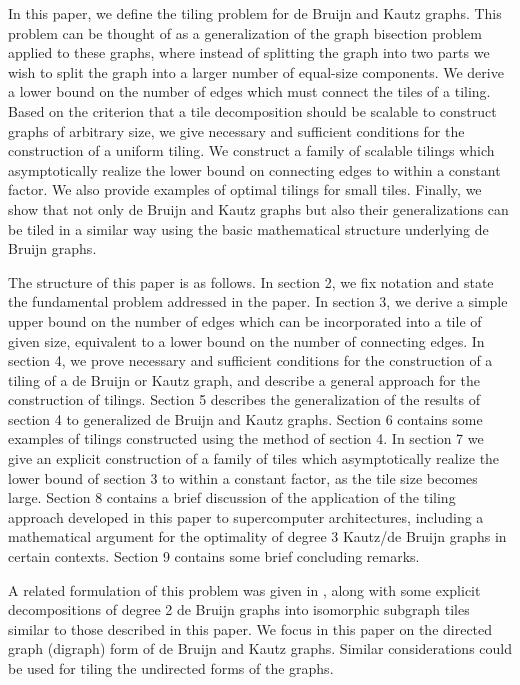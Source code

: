 \documentclass[12pt]{article}
\begin{document}
In this paper, we define the tiling problem for de Bruijn and Kautz
graphs.  This problem can be thought of as a generalization of the
graph bisection problem applied to these graphs, where instead of
splitting the graph into two parts we wish to split the graph into a
larger number of equal-size components.  We derive a lower bound on
the number of edges which must connect the tiles of a tiling.  Based
on the criterion that a tile decomposition should be scalable to
construct graphs of arbitrary size, we give necessary and sufficient
conditions for the construction of a uniform tiling.  We construct a
family of scalable tilings which asymptotically realize the lower
bound on connecting edges to within a constant factor.  We also
provide examples of optimal tilings for small tiles.  Finally, we show
that not only de Bruijn and Kautz graphs but also their
generalizations can be tiled in a similar way using the basic
mathematical structure underlying de Bruijn graphs.


The structure of this paper is as follows.  In section 2, we fix
notation and state the fundamental problem addressed in the paper.  In
section 3, we derive a simple upper bound on the number of edges which
can be incorporated into a tile of given size, equivalent to a lower
bound on the number of connecting edges.  In section 4, we prove
necessary and sufficient conditions for the construction of a tiling
of a de Bruijn or Kautz graph, and describe a general approach for the
construction of tilings.  Section 5 describes the generalization of
the results of section 4 to generalized de Bruijn and Kautz graphs.
Section 6 contains some examples of tilings constructed using the
method of section 4.  In section 7 we give an explicit construction of
a family of tiles which asymptotically realize the lower bound of
section 3 to within a constant factor, as the tile size becomes large.
Section 8 contains a brief discussion of the application of the tiling
approach developed in this paper to supercomputer architectures,
including a mathematical argument for the optimality of degree 3
Kautz/de Bruijn graphs in certain contexts.  Section 9 contains some
brief concluding remarks.

A related formulation of this problem was given in \cite{Viterbi},
along with some explicit decompositions of degree 2 de Bruijn graphs
into isomorphic subgraph tiles similar to those described in this
paper.  We focus in this paper on the directed graph (digraph) form of
de Bruijn and Kautz graphs.  Similar considerations could be used for
tiling the undirected forms of the graphs.
\end{document}
